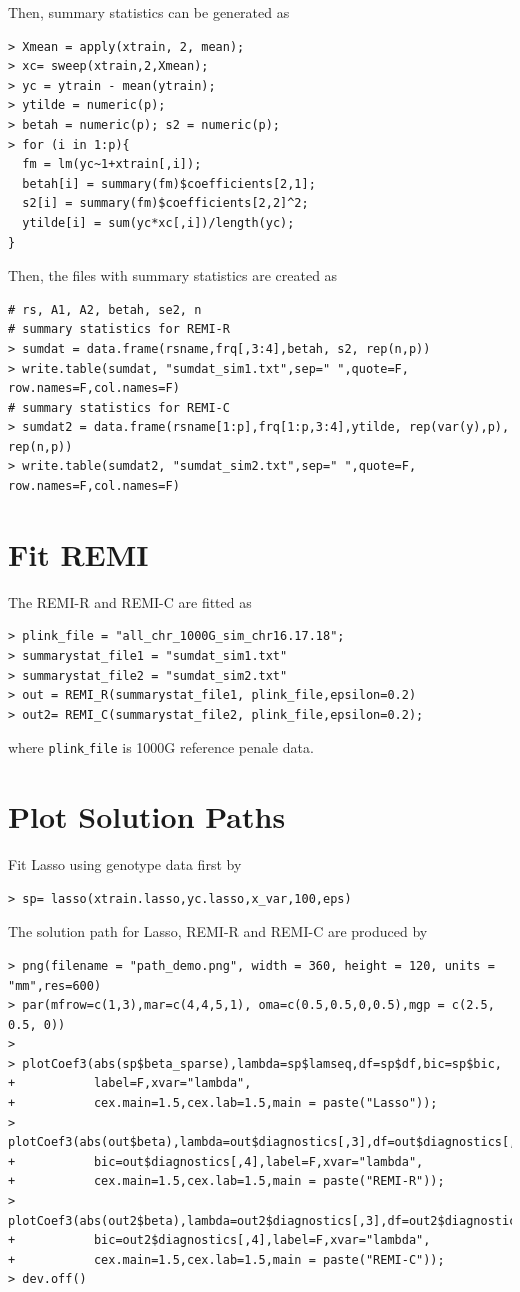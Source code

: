 \documentclass[11pt]{article}
\begin{document}
Then, summary statistics can be generated as
\begin{verbatim}
> Xmean = apply(xtrain, 2, mean);
> xc= sweep(xtrain,2,Xmean);
> yc = ytrain - mean(ytrain);
> ytilde = numeric(p);
> betah = numeric(p); s2 = numeric(p);
> for (i in 1:p){
  fm = lm(yc~1+xtrain[,i]);
  betah[i] = summary(fm)$coefficients[2,1];
  s2[i] = summary(fm)$coefficients[2,2]^2;
  ytilde[i] = sum(yc*xc[,i])/length(yc);
}
\end{verbatim}

Then, the files with summary statistics are created as

\begin{verbatim}
# rs, A1, A2, betah, se2, n
# summary statistics for REMI-R
> sumdat = data.frame(rsname,frq[,3:4],betah, s2, rep(n,p))
> write.table(sumdat, "sumdat_sim1.txt",sep=" ",quote=F, row.names=F,col.names=F)
# summary statistics for REMI-C
> sumdat2 = data.frame(rsname[1:p],frq[1:p,3:4],ytilde, rep(var(y),p), rep(n,p))
> write.table(sumdat2, "sumdat_sim2.txt",sep=" ",quote=F, row.names=F,col.names=F)
\end{verbatim}

\section{Fit REMI}
\label{REMIfit}
The REMI-R and REMI-C are fitted as
\begin{verbatim}
> plink_file = "all_chr_1000G_sim_chr16.17.18";
> summarystat_file1 = "sumdat_sim1.txt"
> summarystat_file2 = "sumdat_sim2.txt"
> out = REMI_R(summarystat_file1, plink_file,epsilon=0.2)
> out2= REMI_C(summarystat_file2, plink_file,epsilon=0.2);
\end{verbatim}
where \texttt{plink$\_$file} is 1000G reference penale data.

\section{Plot Solution Paths}
Fit Lasso using genotype data first by
\begin{verbatim}
> sp= lasso(xtrain.lasso,yc.lasso,x_var,100,eps)
\end{verbatim}
The solution path for Lasso, REMI-R and REMI-C are produced by
\begin{verbatim}
> png(filename = "path_demo.png", width = 360, height = 120, units = "mm",res=600)
> par(mfrow=c(1,3),mar=c(4,4,5,1), oma=c(0.5,0.5,0,0.5),mgp = c(2.5, 0.5, 0))
>
> plotCoef3(abs(sp$beta_sparse),lambda=sp$lamseq,df=sp$df,bic=sp$bic,
+           label=F,xvar="lambda",
+           cex.main=1.5,cex.lab=1.5,main = paste("Lasso"));
> plotCoef3(abs(out$beta),lambda=out$diagnostics[,3],df=out$diagnostics[,1],
+           bic=out$diagnostics[,4],label=F,xvar="lambda",
+           cex.main=1.5,cex.lab=1.5,main = paste("REMI-R"));
> plotCoef3(abs(out2$beta),lambda=out2$diagnostics[,3],df=out2$diagnostics[,1],
+           bic=out2$diagnostics[,4],label=F,xvar="lambda",
+           cex.main=1.5,cex.lab=1.5,main = paste("REMI-C"));
> dev.off()
\end{verbatim}
\end{document}

